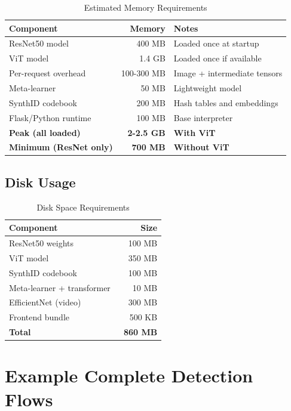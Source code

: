 \documentclass[12pt,a4paper]{book}
\begin{document}
\begin{itemize}
\begin{table}[H]
\centering
\captionsetup{justification=centering}
\caption{Estimated Memory Requirements}
\begin{tabular}{|l|r|p{4cm}|}
\hline
\textbf{Component} & \textbf{Memory} & \textbf{Notes} \\
\hline
ResNet50 model & 400 MB & Loaded once at startup \\
\hline
ViT model & 1.4 GB & Loaded once if available \\
\hline
Per-request overhead & 100-300 MB & Image + intermediate tensors \\
\hline
Meta-learner & 50 MB & Lightweight model \\
\hline
SynthID codebook & 200 MB & Hash tables and embeddings \\
\hline
Flask/Python runtime & 100 MB & Base interpreter \\
\hline
\textbf{Peak (all loaded)} & \textbf{2-2.5 GB} & \textbf{With ViT} \\
\hline
\textbf{Minimum (ResNet only)} & \textbf{700 MB} & \textbf{Without ViT} \\
\hline
\end{tabular}
\end{table}

\subsection{Disk Usage}

\begin{table}[H]
\centering
\captionsetup{justification=centering}
\caption{Disk Space Requirements}
\begin{tabular}{|l|r|}
\hline
\textbf{Component} & \textbf{Size} \\
\hline
ResNet50 weights & 100 MB \\
\hline
ViT model & 350 MB \\
\hline
SynthID codebook & 100 MB \\
\hline
Meta-learner + transformer & 10 MB \\
\hline
EfficientNet (video) & 300 MB \\
\hline
Frontend bundle & 500 KB \\
\hline
\textbf{Total} & \textbf{~860 MB} \\
\hline
\end{tabular}
\end{table}

\section{Example Complete Detection Flows}


\end{itemize}
\end{document}
